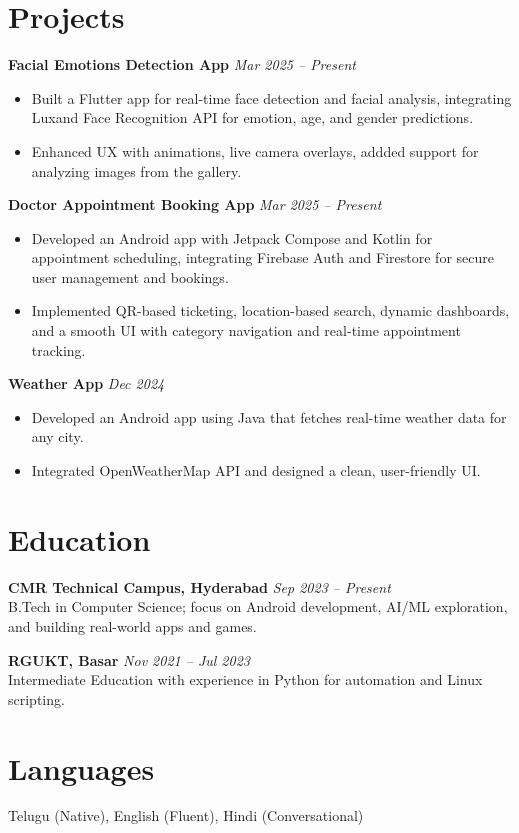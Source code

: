 \documentclass[a4paper,10pt]{article}
\begin{document}
\section*{Projects}

\textbf{Facial Emotions Detection App} \hfill \textit{Mar 2025 – Present} \\
\begin{itemize}[leftmargin=*, itemsep=1pt]
    \item Built a Flutter app for real-time face detection and facial analysis, integrating Luxand Face Recognition API for emotion, age, and gender predictions.
    \item Enhanced UX with animations, live camera overlays, addded support for analyzing images from the gallery.
\end{itemize}



\textbf{Doctor Appointment Booking App} \hfill \textit{Mar 2025 – Present} \\
\begin{itemize}[leftmargin=*, itemsep=1pt]
    \item Developed an Android app with Jetpack Compose and Kotlin for appointment scheduling, integrating Firebase Auth and Firestore for secure user management and bookings.
    \item Implemented QR-based ticketing, location-based search, dynamic dashboards, and a smooth UI with category navigation and real-time appointment tracking.
\end{itemize}

\textbf{Weather App} \hfill \textit{Dec 2024} \\
\begin{itemize}[leftmargin=*, itemsep=1pt]
    \item Developed an Android app using Java that fetches real-time weather data for any city.
    \item Integrated OpenWeatherMap API and designed a clean, user-friendly UI.
\end{itemize}


\section*{Education}

\textbf{CMR Technical Campus, Hyderabad} \hfill \textit{Sep 2023 – Present} \\
B.Tech in Computer Science; focus on Android development, AI/ML exploration, and building real-world apps and games.

\textbf{RGUKT, Basar} \hfill \textit{Nov 2021 – Jul 2023} \\
Intermediate Education with experience in Python for automation and Linux scripting.



\section*{Languages}

Telugu (Native), English (Fluent), Hindi (Conversational)
\end{document}
